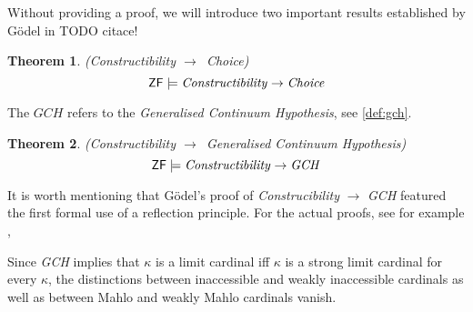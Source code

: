 \documentclass[12pt,a4paper]{article}
\newtheorem{theorem}{Theorem}[section]
\newcommand{\then}{\rightarrow}
\begin{document}
Without providing a proof, we will introduce two important results established by Gödel in TODO citace!

\begin{theorem}{(Constructibility $\then$ Choice)}
\begin{equation}
\sf{ZF} \models \mbox{\emph{Constructibility}} \then \mbox{\emph{Choice}} 
\end{equation}
\end{theorem}

The $GCH$ refers to the \emph{Generalised Continuum Hypothesis}, see \ref{def:gch}.
\begin{theorem}{(Constructibility $\then$ Generalised Continuum Hypothesis)}\label{theorem:l_then_gch}
\begin{equation}
\sf{ZF} \models \mbox{\emph{Constructibility}} \then \mbox{\emph{GCH}} 
\end{equation}
\end{theorem}
It is worth mentioning that Gödel's proof of \emph{Construcibility} $\then$ \emph{GCH} featured the first formal use of a reflection principle. 
For the actual proofs, see for example \cite{Kunen_independence},

Since \emph{GCH} implies that $\kappa$ is a limit cardinal iff $\kappa$ is a strong limit cardinal for every $\kappa$, the distinctions between inaccessible and weakly inaccessible cardinals as well as between Mahlo and weakly Mahlo cardinals vanish.

\end{document}
